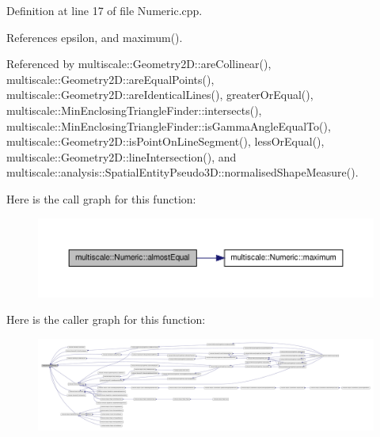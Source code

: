 \-Definition at line 17 of file \-Numeric.\-cpp.



\-References epsilon, and maximum().



\-Referenced by multiscale\-::\-Geometry2\-D\-::are\-Collinear(), multiscale\-::\-Geometry2\-D\-::are\-Equal\-Points(), multiscale\-::\-Geometry2\-D\-::are\-Identical\-Lines(), greater\-Or\-Equal(), multiscale\-::\-Min\-Enclosing\-Triangle\-Finder\-::intersects(), multiscale\-::\-Min\-Enclosing\-Triangle\-Finder\-::is\-Gamma\-Angle\-Equal\-To(), multiscale\-::\-Geometry2\-D\-::is\-Point\-On\-Line\-Segment(), less\-Or\-Equal(), multiscale\-::\-Geometry2\-D\-::line\-Intersection(), and multiscale\-::analysis\-::\-Spatial\-Entity\-Pseudo3\-D\-::normalised\-Shape\-Measure().



\-Here is the call graph for this function\-:
\nopagebreak
\begin{figure}[H]
\begin{center}
\leavevmode
\includegraphics[width=350pt]{classmultiscale_1_1Numeric_a996dda9f7361be59b4614eace0b93f24_cgraph}
\end{center}
\end{figure}




\-Here is the caller graph for this function\-:
\nopagebreak
\begin{figure}[H]
\begin{center}
\leavevmode
\includegraphics[width=350pt]{classmultiscale_1_1Numeric_a996dda9f7361be59b4614eace0b93f24_icgraph}
\end{center}
\end{figure}



